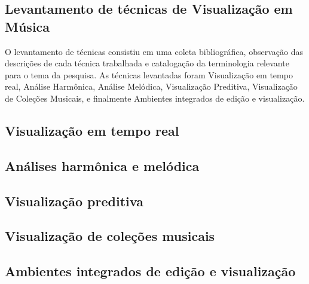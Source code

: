 \documentclass{sciposter}
\begin{document}
\begin{multicols}{2}

\section{Levantamento de técnicas de Visualização em Música}

O levantamento de técnicas consistiu em uma coleta bibliográfica, observação
das descrições de cada técnica trabalhada e catalogação da terminologia
relevante para o tema da pesquisa. As técnicas levantadas foram Visualização em
tempo real, Análise Harmônica, Análise Melódica, Visualização Preditiva,
Visualização de Coleções Musicais, e finalmente Ambientes integrados de edição
e visualização.

\subsection{Visualização em tempo real}

\subsection{Análises harmônica e melódica}

\subsection{Visualização preditiva}

\subsection{Visualização de coleções musicais}

\subsection{Ambientes integrados de edição e visualização}




\end{multicols}
\end{document}
